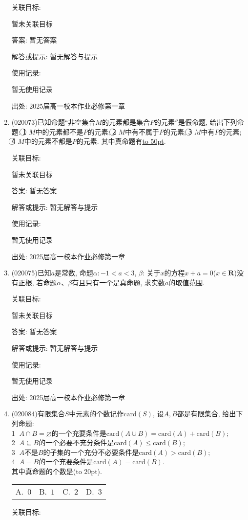 \documentclass[10pt,a4paper]{article}
\newcommand{\blank}[1]{\underline{\hbox to #1pt{}}}
\newcommand{\bracket}[1]{(\hbox to #1pt{})}
\newcommand{\fourch}[4]{\par\begin{tabular}{p{.23\textwidth}p{.23\textwidth}p{.23\textwidth}p{.23\textwidth}}
A.~#1 &B.~#2& C.~#3& D.~#4
\end{tabular}}
\begin{document}
\begin{enumerate}[1.]
关联目标:

暂未关联目标

答案: 暂无答案

解答或提示: 暂无解答与提示

使用记录:

暂无使用记录


出处: 2025届高一校本作业必修第一章
\item { (020073)}已知命题``非空集合$M$的元素都是集合$P$的元素$''$是假命题, 给出下列命题: \textcircled{1} $M$中的元素都不是$P$的元素; \textcircled{2} $M$中有不属于$P$的元素; \textcircled{3} $M$中有$P$的元素; \textcircled{4} $M$中的元素不都是$P$的元素. 其中真命题有\blank{50}.


关联目标:

暂未关联目标

答案: 暂无答案

解答或提示: 暂无解答与提示

使用记录:

暂无使用记录


出处: 2025届高一校本作业必修第一章
\item { (020075)}已知$a$是常数, 命题$\alpha :-1<a<3$, $\beta$: 关于$x$的方程$x+a=0$($x\in \mathbf{R}$)没有正根, 若命题$\alpha$、$\beta$有且只有一个是真命题, 求实数$a$的取值范围.


关联目标:

暂未关联目标

答案: 暂无答案

解答或提示: 暂无解答与提示

使用记录:

暂无使用记录


出处: 2025届高一校本作业必修第一章
\item { (020084)}有限集合$S$中元素的个数记作$\mathrm{card}(S)$, 设$A,B$都是有限集合, 给出下列命题:\\
\textcircled{1} $A\cap B=\varnothing$的一个充要条件是$\mathrm{card}(A\cup B)=\mathrm{card}(A)+\mathrm{card}(B)$;\\
\textcircled{2} $A\subseteq B$的一个必要不充分条件是$\mathrm{card}(A)\le \mathrm{card}(B)$; \\
\textcircled{3} $A$不是$B$的子集的一个充分不必要条件是$\mathrm{card}(A)>\mathrm{card}(B)$;\\ 
\textcircled{4} $A=B$的一个充要条件是$\mathrm{card}(A)=\mathrm{card}(B)$.\\ 
其中真命题的个数是\bracket{20}.
\fourch{$0$}{$1$}{$2$}{$3$}


关联目标:


\end{enumerate}
\end{document}
